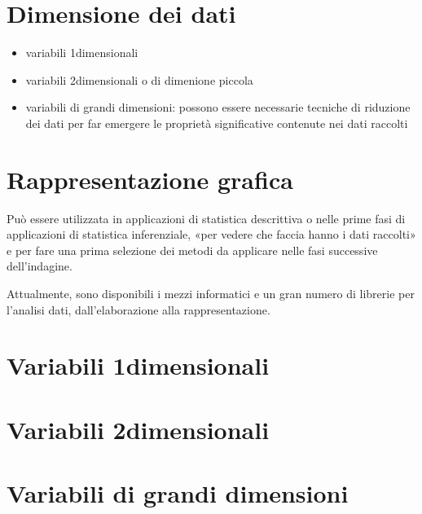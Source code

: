\documentclass[letterpaper,10pt,italian]{jupyterBook}
\begin{document}
\section{Dimensione dei dati}
\label{\detokenize{ch/statistics/descriptive:dimensione-dei-dati}}\begin{itemize}
\item {} 
\sphinxAtStartPar
variabili 1\sphinxhyphen{}dimensionali

\item {} 
\sphinxAtStartPar
variabili 2\sphinxhyphen{}dimensionali o di dimenione piccola

\item {} 
\sphinxAtStartPar
variabili di grandi dimensioni: possono essere necessarie tecniche di riduzione dei dati per far emergere le proprietà significative contenute nei dati raccolti

\end{itemize}


\section{Rappresentazione grafica}
\label{\detokenize{ch/statistics/descriptive:rappresentazione-grafica}}
\sphinxAtStartPar
{} Può essere utilizzata in applicazioni di statistica descrittiva o nelle prime fasi di applicazioni di statistica inferenziale, «per vedere che faccia hanno i dati raccolti» e per fare una prima selezione dei metodi da applicare nelle fasi successive dell’indagine.

\sphinxAtStartPar
Attualmente, sono disponibili i mezzi informatici e un gran numero di librerie per l’analisi dati, dall’elaborazione alla rappresentazione.


\section{Variabili 1\sphinxhyphen{}dimensionali}
\label{\detokenize{ch/statistics/descriptive:variabili-1-dimensionali}}

\section{Variabili 2\sphinxhyphen{}dimensionali}
\label{\detokenize{ch/statistics/descriptive:variabili-2-dimensionali}}

\section{Variabili di grandi dimensioni}
\label{\detokenize{ch/statistics/descriptive:variabili-di-grandi-dimensioni}}
\sphinxstepscope
\end{document}
